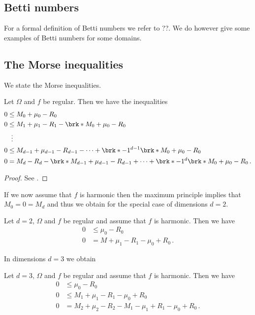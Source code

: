 \subsection{Betti numbers}

For a formal definition of Betti numbers we refer to ??.
We do however give some examples of Betti numbers for some domains.

\subsection{The Morse inequalities}

We state the Morse inequalities.
\begin{theorem}
Let $\Omega$ and $f$ be regular. Then we have the inequalities
\begin{align*}
  0&\leq M_0+\mu_0-R_0\\
  0&\leq M_1+\mu_1-R_1-\brk*{M_0+\mu_0-R_0} \\
  &\;\;\vdots \\
  0&\leq M_{d-1}+\mu_{d-1}-R_{d-1}-\cdots +\brk*{-1}^{d-1}\brk*{M_0+\mu_0-R_0} \\
  0&=M_{d}-R_{d}-\brk*{M_{d-1}+\mu_{d-1}-R_{d-1}}+\cdots +\brk*{-1}^{d}\brk*{M_0+\mu_0-R_0}\,.
\end{align*}
\end{theorem}
\begin{proof}
  See \cite{Morse1969}.
\end{proof}
If we now assume that $f$ is harmonic then the maximum principle implies that
$M_0=0=M_d$ and thus we obtain for the special case of dimensions $d=2$.
\begin{corollary}[Morse inequalities for $f$ harmonic, $d=2$]
  Let $d=2$, $\Omega$ and $f$ be regular and assume that $f$ is harmonic. Then we have
  \begin{align*}
    0&\leq \mu_0-R_0 \\
    0&=M+\mu_1-R_1-\mu_0+R_0\,.
  \end{align*}
\end{corollary}
In dimensions $d=3$ we obtain
\begin{corollary}[Morse inequalities for $f$ harmonic, $d=3$]
  Let $d=3$, $\Omega$ and $f$ be regular and assume that $f$ is harmonic. Then we have
  \begin{align*}
    0&\leq \mu_0-R_0 \\
    0&\leq M_1+\mu_1-R_1-\mu_0+R_0 \\
    0&= M_2+\mu_2-R_2-M_1-\mu_1+R_1-\mu_0+R_0\,.
  \end{align*}
\end{corollary}

